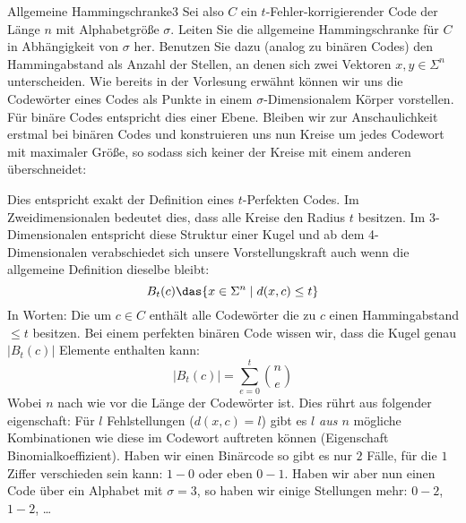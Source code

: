 \begin{aufgabe}{Allgemeine Hammingschranke}{3}
Sei also $C$ ein $t$-Fehler-korrigierender Code der Länge $n$ mit
Alphabetgröße $\sigma$. Leiten Sie die allgemeine Hammingschranke für $C$ in
Abhängigkeit von $\sigma$ her. Benutzen Sie dazu (analog zu binären Codes) den
Hammingabstand als Anzahl der Stellen, an denen sich zwei Vektoren $x,y \in \Sigma^n$ unterscheiden.
\Splitter
Wie bereits in der Vorlesung erwähnt können wir uns die Codewörter eines Codes als Punkte in einem $\sigma$-Dimensionalem Körper vorstellen. Für binäre Codes entspricht dies einer Ebene. Bleiben wir zur Anschaulichkeit erstmal bei binären Codes und konstruieren uns nun Kreise um jedes Codewort mit maximaler Größe, so sodass sich keiner der Kreise mit einem anderen überschneidet:
\begin{wrapfigure}{l}{0.275\textwidth}
    \centering\vspace{-7pt}
\end{wrapfigure}
Dies entspricht exakt der Definition eines \(t\)-Perfekten Codes. Im Zweidimensionalen bedeutet dies, dass alle Kreise den Radius \(t\) besitzen. Im 3-Dimensionalen entspricht diese Struktur einer Kugel und ab dem 4-Dimensionalen verabschiedet sich unsere Vorstellungskraft auch wenn die allgemeine Definition dieselbe bleibt: $$ B_t(c) \das \{x \in \Sigma^n \mid d(x,c) \leq t\}$$
In Worten: Die  um $c \in C$ enthält alle Codewörter die zu $c$ einen Hammingabstand $\leq t$ besitzen. Bei einem perfekten binären Code wissen wir, dass die Kugel genau $|B_t(c)|$ Elemente enthalten kann: $$|B_t(c)| = \sum\limits_{e=0}^t\binom{n}{e}$$
Wobei \(n\) nach wie vor die Länge der Codewörter ist. Dies rührt aus folgender eigenschaft: Für $l$ Fehlstellungen ($d(x,c) = l$) gibt es \emph{$l$ aus $n$} mögliche Kombinationen wie diese im Codewort auftreten können (Eigenschaft Binomialkoeffizient). Haben wir einen Binärcode so gibt es nur $2$ Fälle, für die $1$ Ziffer verschieden sein kann: $1 - 0$ oder eben $0 - 1$. Haben wir aber nun einen Code über ein Alphabet mit $\sigma = 3$, so haben wir einige Stellungen mehr: $0 - 2$, $1 - 2$, \ldots\newline

\end{aufgabe}
